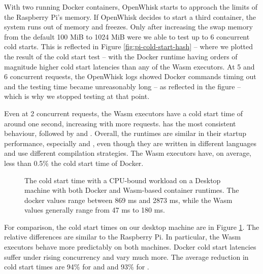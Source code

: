 With two running Docker containers, OpenWhisk starts to approach the limits of the Raspberry Pi's memory. If OpenWhisk decides to start a third container, the system runs out of memory and freezes. Only after increasing the swap memory from the default 100 MiB to 1024 MiB were we able to test up to 6 concurrent cold starts.
This is reflected in Figure \ref{fig:pi-cold-start-hash} -- where we plotted the result of the cold start test -- with the Docker runtime having orders of magnitude higher cold start latencies than any of the Wasm executors. At 5 and 6 concurrent requests, the OpenWhisk logs showed Docker commands timing out and the testing time became unreasonably long -- as reflected in the figure -- which is why we stopped testing at that point.

Even at 2 concurrent requests, the Wasm executors have a cold start time of around one second, increasing with more requests.  has the most consistent behaviour, followed by  and . Overall, the runtimes are similar in their startup performance, especially  and , even though they are written in different languages and use different compilation strategies. The Wasm executors have, on average, less than 0.5\% the cold start time of Docker.


\begin{figure}
    \begin{center}
        
    \end{center}
    \caption{The cold start time with a CPU-bound workload on a Desktop machine with both Docker and Wasm-based container runtimes. The docker values range between 869 ms and 2873 ms, while the Wasm values generally range from 47 ms to 180 ms.}
    \label{fig:pc-cold-start-hash}
\end{figure}

For comparison, the cold start times on our  desktop machine are in Figure \ref{fig:pc-cold-start-hash}. The relative differences are similar to the Raspberry Pi. In particular, the Wasm executors behave more predictably on both machines. Docker cold start latencies suffer under rising concurrency and vary much more.
The average reduction in cold start times are 94\% for  and  and 93\% for .

